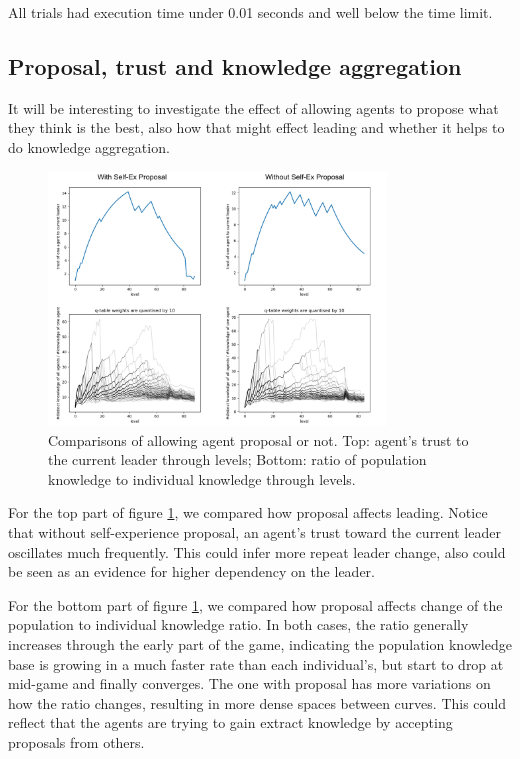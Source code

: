 All trials had execution time under 0.01 seconds and well below the time limit.

\subsection{Proposal, trust and knowledge aggregation}
It will be interesting to investigate the effect of allowing agents to propose what they think is the best, also how that might effect leading and whether it helps to do knowledge aggregation.

\begin{figure}[!ht]
    \centering
    \includegraphics[width=0.8\textwidth]{008_team_5_agent_design/images/knowledgeAgg.png}
    \caption{Comparisons of allowing agent proposal or not. Top: agent's trust to the current leader through levels; Bottom: ratio of population knowledge to individual knowledge through levels.}
    \label{fig:knowledgeAgg}
\end{figure}
\pagebreak
For the top part of figure \ref{fig:knowledgeAgg}, we compared how proposal affects leading. Notice that without self-experience proposal, an agent's trust toward the current leader oscillates much frequently. This could infer more repeat leader change, also could be seen as an evidence for higher dependency on the leader.

For the bottom part of figure \ref{fig:knowledgeAgg}, we compared how proposal affects change of the population to individual knowledge ratio. In both cases, the ratio generally increases through the early part of the game, indicating the population knowledge base is growing in a much faster rate than each individual's, but start to drop at mid-game and finally converges. The one with proposal has more variations on how the ratio changes, resulting in more dense spaces between curves. This could reflect that the agents are trying to gain extract knowledge by accepting proposals from others.
